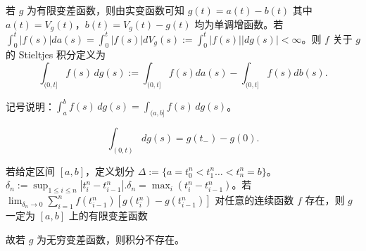 \documentclass[lang=cn,10pt,thmcnt=section]{elegantbook}
\begin{document}
\begin{definition}
	若 \(g\) 为有限变差函数，则由实变函数可知 \(g(t) = a(t) - b(t)\) 其中 \(a(t) = V_g(t)\)，\(b(t) = V_g(t) - g(t)\) 均为单调增函数。若 \(\int_0^t |f(s)| da(s) = \int_0^t |f(s)| dV_g(s) := \int_0^t |f(s)| |dg(s)| < \infty\)。则 \(f\) 关于 \(g\) 的 Stieltjes 积分定义为
\[
\int_{(0,t]} f(s) \, dg(s) := \int_{(0,t]} f(s) da(s) - \int_{(0,t]} f(s) db(s).
\]
\end{definition}

\begin{remark}
	记号说明：\(\int_a^b f(s) \, dg(s) = \int_{(a,b]} f(s) \, dg(s)\)。

\[
\int_{(0,t)} dg(s) = g(t_-) - g(0).
\]
\end{remark}
\begin{theorem}[Protter]
	若给定区间 \([a, b]\)，定义划分 \(\Delta := \{a = t_0^n < t_1^n \ldots < t_n^n = b\}\)。\(\delta_n := \sup_{1 \leq i \leq n} |t_i^n - t_{i-1}^n|\).\(\delta_n = \max_i (t_i^n - t_{i-1}^n)\)。若 \(\lim_{\delta_n \to 0} \sum_{i=1}^{n} f(t_{i-1}^n) [g(t_i^n) - g(t_{i-1}^n)]\) 对任意的连续函数 \(f\) 存在，则 \(g\) 一定为 \([a, b]\) 上的有限变差函数
\end{theorem}
故若 \(g\) 为无穷变差函数，则积分不存在。
\end{document}
